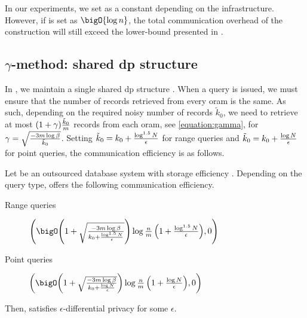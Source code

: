 		In our experiments, we set \oramsNumber{} as a constant depending on the infrastructure.
		However, if \oramsNumber{} is set as $\bigO{\log n}$, the total communication overhead of the construction will still exceed the lower-bound presented in \cite{multi-server-orams}.

	\subsection{\texorpdfstring{$\gamma$-method}{Gamma-method}: shared \acrshort{dp} structure}\label{section:range-persistent:prallel-dp-oram:gamma}

		In \protocolGamma{}, we maintain a single shared \acrshort{dp} structure \serverDS{}.
		When a query is issued, we must ensure that the number of records retrieved from every \acrshort{oram} is the same.
		As such, depending on the required noisy number of records $\tilde{k}_0$, we need to retrieve at most $( 1 + \gamma ) \frac{ \tilde{k}_0 }{m}$ records from each \acrshort{oram}, see \cref{equation:gamma}, for $\gamma = \sqrt{ \frac{-3 m \log \beta}{ \tilde{k}_0 } }$.
		Setting $\tilde{k}_0 = k_0 + \frac{\log^{1.5} N}{\epsilon}$ for range queries and $\tilde{k}_0 = k_0 + \frac{\log N}{\epsilon}$ for point queries, the communication efficiency is as follows.

		\begin{corollary}\label{corollary:gamma}
			Let \protocolGamma{} be an outsourced database system with storage efficiency .
			Depending on the query type, \protocolGamma{} offers the following communication efficiency.
			\begin{description}
				\item[Range queries] $\efficiency{ \left( 1 + \sqrt{ \frac{-3 \oramsNumber \log \beta}{k_0 + \frac{ \log^{1.5} \domainSize }{ \epsilon }} }\right) \log \frac{\dataSize}{\oramsNumber} \left( 1 + \frac{\log^{1.5} \domainSize}{\epsilon} \right) }{0}$
				\item[Point queries] $\efficiency{ \left( 1 + \sqrt{ \frac{-3 \oramsNumber \log \beta}{k_0 + \frac{ \log \domainSize }{ \epsilon }} }\right) \log \frac{\dataSize}{\oramsNumber} \left( 1 + \frac{\log \domainSize}{\epsilon} \right) }{0}$
			\end{description}
			Then, \protocolGamma{} satisfies $\epsilon$-differential privacy for some $\epsilon$.
		\end{corollary}

